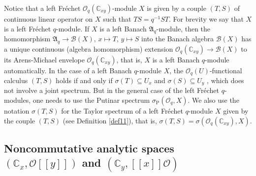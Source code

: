 \documentclass[12pt]{amsart}%
\theoremstyle{plain}
\numberwithin{equation}{section}
\numberwithin{equation}{section}
\numberwithin{theorem}{section}
\numberwithin{lemma}{section}
\numberwithin{remark}{section}
\numberwithin{example}{section}
\numberwithin{proposition}{section}
\numberwithin{definition}{section}
\numberwithin{corollary}{section}
\begin{document}
Notice that a left Fr\'{e}chet $\mathcal{O}_{q}\left(  \mathbb{C}_{xy}\right)
$-module $X$ is given by a couple $\left(  T,S\right)  $ of continuous linear
operator on $X$ such that $TS=q^{-1}ST$. For brevity we say that $X$ is a left
Fr\'{e}chet $q$-module. If $X$ is a left Banach $\mathfrak{A}_{q}$-module,
then the homomorphism $\mathfrak{A}_{q}\rightarrow\mathcal{B}\left(  X\right)
$, $x\mapsto T$, $y\mapsto S$ into the Banach algebra $\mathcal{B}\left(
X\right)  $ has a unique continuous (algebra homomorphism) extension
$\mathcal{O}_{q}\left(  \mathbb{C}_{xy}\right)  \rightarrow\mathcal{B}\left(
X\right)  $ to its Arens-Michael envelope $\mathcal{O}_{q}\left(
\mathbb{C}_{xy}\right)  $, that is, $X$ is a left Banach $q$-module
automatically. In the case of a left Banach $q$-module $X$, the $\mathcal{O}%
_{q}\left(  U\right)  $-functional calculus $\left(  T,S\right)  $ holds if
and only if $\sigma\left(  T\right)  \subseteq U_{x}$ and $\sigma\left(
S\right)  \subseteq U_{y}$ \cite[Theorem 5.2]{Dosi24}, which does not involve
a joint spectrum. But in the general case of the left Fr\'{e}chet $q$-modules,
one needs to use the Putinar spectrum $\sigma_{\operatorname{P}}\left(
\mathcal{O}_{q},X\right)  $. We also use the notation $\sigma\left(
T,S\right)  $ for the Taylor spectrum of a left Fr\'{e}chet $q$-module $X$
given by the couple $\left(  T,S\right)  $ (see Definition \ref{def11}), that
is, $\sigma\left(  T,S\right)  =\sigma\left(  \mathcal{O}_{q}\left(
\mathbb{C}_{xy}\right)  ,X\right)  $.

\subsection{Noncommutative analytic spaces $\left(  \mathbb{C}_{x}%
,\mathcal{O}\left[  \left[  y\right]  \right]  \right)  $ and $\left(
\mathbb{C}_{y},\left[  \left[  x\right]  \right]  \mathcal{O}\right)  $}
\end{document}
